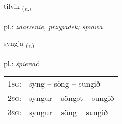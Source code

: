 \documentclass[frontgrid, backgrid]{flacards}\usepackage[]{graphicx}\usepackage[]{xcolor}
\begin{document}
\renewcommand{\flhead}{\vskip5pt \fboxsep=0pt {\small\bfseries\footnotesize Nafnorð | Noun}}
\renewcommand{\fcfoot}{\vskip5pt \fboxsep=0pt \hspace{2pt}{\small\bfseries\footnotesize 1K}}

\renewcommand{\blhead}{\vskip5pt {\small\bfseries\footnotesize Nafnorð | Noun }}
\renewcommand{\bcfoot}{\vskip5pt \hspace{2pt}{\small\bfseries\footnotesize 1K}}


{tilvik \small{\textsubscript{(\textit{n.})}} \\[1ex] %
\textphonetic{[tʰɪlvɪk]} \\
pl.: \emph{zdarzenie, przypadek; sprawa} \\  [2ex]
\renewcommand*{\arraystretch}{0.8}
}

\renewcommand{\flhead}{\vskip5pt \fboxsep=0pt {\small\bfseries\footnotesize Sagnorð | Verb}}
\renewcommand{\fcfoot}{\vskip5pt \fboxsep=0pt \hspace{2pt}{\small\bfseries\footnotesize 1K}}

\renewcommand{\blhead}{\vskip5pt {\small\bfseries\footnotesize Sagnorð | Verb }}
\renewcommand{\bcfoot}{\vskip5pt \hspace{2pt}{\small\bfseries\footnotesize 1K}}


{syngja \small{\textsubscript{(\textit{v.})}} \\[1ex] %
\textphonetic{[siɲca]} \\
pl.: \emph{śpiewać} \\  [2ex]
\renewcommand*{\arraystretch}{0.8}
\begin{tabular}{p{1cm}l}
\textsc{1sg}: & syng -- söng -- sungið \\ 
\textsc{2sg}: & syngur -- söngst -- sungið \\ 
\textsc{3sg}: & syngur -- söng -- sungið \\ 
\end{tabular}
}
\end{document}
